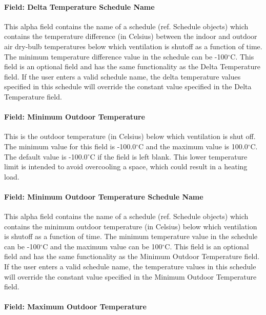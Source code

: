 \paragraph{Field: Delta Temperature Schedule Name}\label{field-delta-temperature-schedule-name-1}

This alpha field contains the name of a schedule (ref. Schedule objects) which contains the temperature difference (in Celsius) between the indoor and outdoor air dry-bulb temperatures below which ventilation is shutoff as a function of time. The minimum temperature difference value in the schedule can be -100$^\circ$C. This field is an optional field and has the same functionality as the Delta Temperature field. If the user enters a valid schedule name, the delta temperature values specified in this schedule will override the constant value specified in the Delta Temperature field.

\paragraph{Field: Minimum Outdoor Temperature}\label{field-minimum-outdoor-temperature-1}

This is the outdoor temperature (in Celsius) below which ventilation is shut off. The minimum value for this field is -100.0$^\circ$C and the maximum value is 100.0$^\circ$C. The default value is -100.0$^\circ$C if the field is left blank. This lower temperature limit is intended to avoid overcooling a space, which could result in a heating load.

\paragraph{Field: Minimum Outdoor Temperature Schedule Name}\label{field-minimum-outdoor-temperature-schedule-name-1}

This alpha field contains the name of a schedule (ref. Schedule objects) which contains the minimum outdoor temperature (in Celsius) below which ventilation is shutoff as a function of time. The minimum temperature value in the schedule can be -100$^\circ$C and the maximum value can be 100$^\circ$C. This field is an optional field and has the same functionality as the Minimum Outdoor Temperature field. If the user enters a valid schedule name, the temperature values in this schedule will override the constant value specified in the Minimum Outdoor Temperature field.

\paragraph{Field: Maximum Outdoor Temperature}\label{field-maximum-outdoor-temperature-1}

